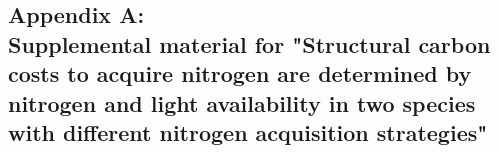 \begin{singlespace}
    \chapter{\textbf{Appendix A: \\ Supplemental material for "Structural carbon costs to acquire nitrogen are determined by nitrogen and light availability in two species with different nitrogen acquisition strategies"}}
\end{singlespace}

\setcounter{table}{0}
\renewcommand{\thetable}{A\arabic{table}}

\setcounter{figure}{0}
\renewcommand{\thefigure}{A\arabic{figure}}

\begin{table}[h!]
    \caption{Summary table containing volumes of compounds used to create modified Hoagland's solutions for each soil nitrogen fertilization treatment. All volumes are expressed as milliliters per liter (mL/L)}
    \label{table:tab.a1}
\end{table}
